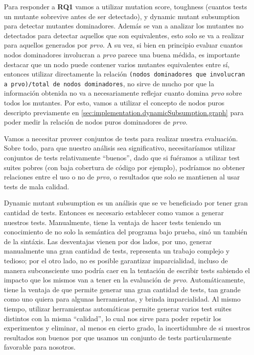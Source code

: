 Para responder a \textbf{RQ1} vamos a utilizar mutation score, toughness (cuantos tests un mutante sobrevive antes de ser detectado), y dynamic mutant subsumption para detectar mutantes dominadores. Adem\'as se van a analizar los mutantes no detectados para detectar aquellos que son equivalentes, esto solo se va a realizar para aquellos generados por \emph{prvo}. A su vez, si bien en principio evaluar cuantos nodos dominadores involucran a \emph{prvo} parece una buena m\'edida, es importante destacar que un nodo puede contener varios mutantes equivalentes entre s\'i, entonces utilizar directamente la relaci\'on \texttt{(nodos dominadores que involucran a prvo)/total de nodos dominadores}, no sirve de mucho por que la informaci\'on obtenida no va a necesariamente reflejar cuanto domina \emph{prvo} sobre todos los mutantes. Por esto, vamos a utilizar el concepto de nodos puros descripto previamente en \ref{sec:implementation.dynamicSubsumption.graph} para poder medir la relaci\'on de nodos puros dominadores de \emph{prvo}.

Vamos a necesitar proveer conjuntos de tests para realizar nuestra evaluaci\'on. Sobre todo, para que nuestro an\'alisis sea significativo, necesitar\'iamos utilizar conjuntos de tests relativamente ``buenos'', dado que si fu\'eramos a utilizar test suites pobres (con baja cobertura de c\'odigo por ejemplo), podr\'iamos no obtener relaciones entre el uso o no de \emph{prvo}, o resultados que solo se mantienen al usar tests de mala calidad.

Dynamic mutant subsumption es un an\'alisis que se ve beneficiado por tener gran cantidad de tests. Entonces es necesario establecer como vamos a generar nuestros tests. Manualmente, tiene la ventaja de hacer tests teniendo un conocimiento de no solo la sem\'antica del programa bajo prueba, sin\'o un tambi\'en de la sint\'axis. Las desventajas vienen por dos lados, por uno, generar manualmente una gran cantidad de tests, representa un trabajo complejo y tedioso; por el otro lado, no es posible garantizar imparcialidad, incluso de manera subconsciente uno podr\'ia caer en la tentaci\'on de escribir tests sabiendo el impacto que los mismos van a tener en la evaluaci\'on de \emph{prvo}. Autom\'aticamente, tiene la ventaja de que permite generar una gran cantidad de tests, tan grande como uno quiera para algunas herramientas, y brinda imparcialidad. Al mismo tiempo, utilizar herramientas autom\'aticas permite generar varios test suites distintos con la misma ``calidad'', lo cual nos sirve para poder repetir los experimentos y eliminar, al menos en cierto grado, la incertidumbre de si nuestros resultados son buenos por que usamos un conjunto de tests particularmente favorable para nosotros. 

